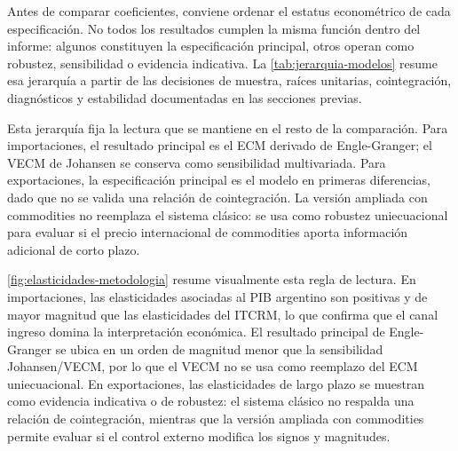 \documentclass[11pt,a4paper]{article}
\begin{document}
	Antes de comparar coeficientes, conviene ordenar el estatus econométrico de
	cada especificación. No todos los resultados cumplen la misma función dentro
	del informe: algunos constituyen la especificación principal, otros operan como
	robustez, sensibilidad o evidencia indicativa. La \autoref{tab:jerarquia-modelos}
	resume esa jerarquía a partir de las decisiones de muestra, raíces unitarias,
	cointegración, diagnósticos y estabilidad documentadas en las secciones
	previas.

	\begin{table}[H]
		\centering
		\caption{Jerarquía final de modelos por flujo comercial.}
		\label{tab:jerarquia-modelos}
		\scriptsize
		\caption*{\footnotesize Nota: ``exportaciones con commodities'' no define un
			tercer sistema; es una especificación ampliada del sistema de exportaciones
			usada como robustez con control externo. La tabla resume la jerarquía del
			archivo .}
	\end{table}

	Esta jerarquía fija la lectura que se mantiene en el resto de la comparación.
	Para importaciones, el resultado principal es el ECM derivado de
	Engle-Granger; el VECM de Johansen se conserva como sensibilidad multivariada.
	Para exportaciones, la especificación principal es el modelo en primeras
	diferencias, dado que no se valida una relación de cointegración. La versión
	ampliada con commodities no reemplaza el sistema clásico: se usa como robustez
	uniecuacional para evaluar si el precio internacional de commodities aporta
	información adicional de corto plazo.

	\autoref{fig:elasticidades-metodologia} resume visualmente esta regla de
	lectura. En importaciones, las elasticidades asociadas al PIB argentino son
	positivas y de mayor magnitud que las elasticidades del ITCRM, lo que confirma
	que el canal ingreso domina la interpretación económica. El resultado principal
	de Engle-Granger se ubica en un orden de magnitud menor que la sensibilidad
	Johansen/VECM, por lo que el VECM no se usa como reemplazo del ECM
	uniecuacional. En exportaciones, las elasticidades de largo plazo se muestran
	como evidencia indicativa o de robustez: el sistema clásico no respalda una
	relación de cointegración, mientras que la versión ampliada con commodities
	permite evaluar si el control externo modifica los signos y magnitudes.
\end{document}
